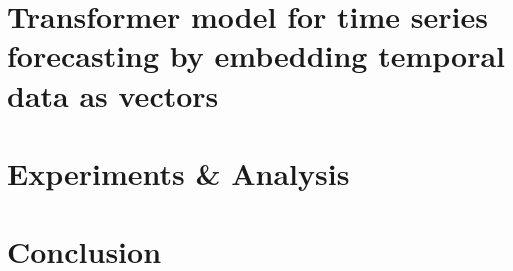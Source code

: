 \section{Transformer model for time series forecasting by embedding temporal data as vectors} %




\section{Experiments \& Analysis}\label{sec:ExpRes}


\section{Conclusion}





\appendix
%

